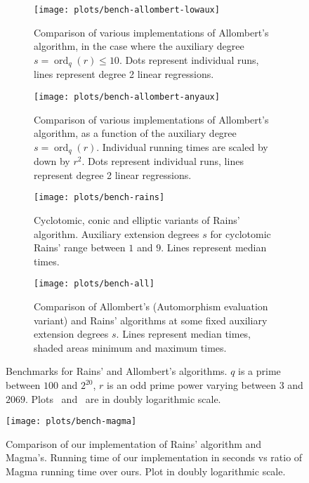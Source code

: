 \documentclass{mcom-l}
\theoremstyle{plain}
\theoremstyle{definition}
\DeclareMathOperator{\order}{ord} %
\newcounter{algorithm}
\begin{document}
\begin{figure}
  \newlength{\mywidth}
  \setlength{\mywidth}{6cm}
  \centering

  \begin{subfigure}{.48\textwidth}
    \texttt{[image: plots/bench-allombert-lowaux]}
    \caption{Comparison of various implementations of Allombert's
      algorithm, in the case where the auxiliary degree
      $s=\order_q(r)\le 10$.  Dots represent individual runs, lines
      represent degree 2 linear regressions.}
    \label{fig:bench:allombert-lowaux}
  \end{subfigure}
  \hfill
  \begin{subfigure}{.48\textwidth}
    \noindent
    \texttt{[image: plots/bench-allombert-anyaux]}
    \caption{Comparison of various implementations of Allombert's
      algorithm, as a function of the auxiliary degree
      $s=\order_q(r)$.  Individual running times are scaled by down by
      $r^2$.  Dots represent individual runs, lines represent degree 2
      linear regressions.}
    \label{fig:bench:allombert-anyaux}
  \end{subfigure}

  \begin{subfigure}{.48\textwidth}
    \noindent
    \texttt{[image: plots/bench-rains]}
    \caption{Cyclotomic, conic and elliptic variants of Rains'
      algorithm.  Auxiliary extension degrees $s$ for cyclotomic
      Rains' range between $1$ and $9$. Lines represent median times.}
    \label{fig:bench:rains}
  \end{subfigure}
  \hfill
  \begin{subfigure}{.48\textwidth}
    \noindent
    \texttt{[image: plots/bench-all]}
    \caption{Comparison of Allombert's (Automorphism evaluation
      variant) and Rains' algorithms at some fixed auxiliary extension
      degrees $s$. Lines represent median times, shaded areas minimum
      and maximum times.}
    \label{fig:bench:all}
  \end{subfigure}

  \caption{Benchmarks for Rains' and Allombert's algorithms. $q$ is a
    prime between $100$ and $2^{20}$, $r$ is an odd prime power
    varying between $3$ and $2069$.  Plots~
    and~ are in doubly logarithmic scale.}
  \label{fig:bench}
\end{figure}

\begin{figure}
  \centering
  \texttt{[image: plots/bench-magma]}
  \caption{Comparison of our implementation of Rains' algorithm and
    Magma's. Running time of our implementation in seconds vs ratio of
    Magma running time over ours. Plot in doubly logarithmic scale.}
  \label{fig:bench:magma}
\end{figure}
\end{document}
